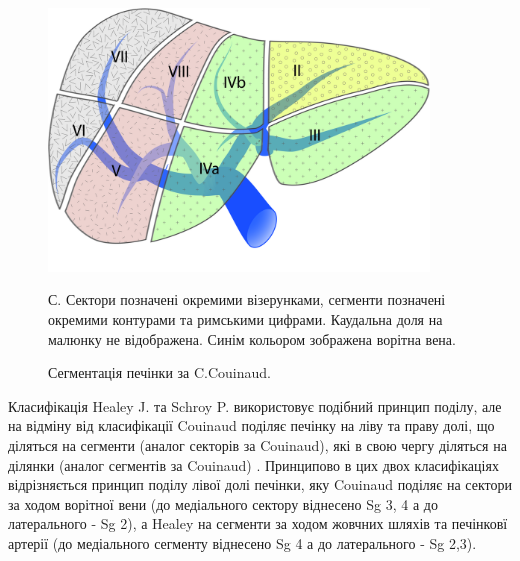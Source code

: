\begin{figure}[h]
\caption{Сегментація печінки за C.Couinaud.}

\includegraphics[width=0.9\textwidth]{Illustrations/Chapter_01/Couinaud.jpg}
\label{fig:Couinaud}

\medskip
\small
С. Сектори позначені окремими візерунками, сегменти позначені окремими контурами та римськими цифрами. Каудальна доля на малюнку не відображена. Синім кольором зображена ворітна вена.

\end{figure}

Класифікація Healey J. та Schroy P. використовує подібний принцип поділу, але на відміну від класифікації Couinaud поділяє печінку на ліву та праву долі, що діляться на сегменти (аналог секторів за Couinaud), які в свою чергу діляться на ділянки (аналог сегментів за Couinaud) \cite{HEALEY1953}. Принципово в цих двох класифікаціях відрізняється принцип поділу лівої долі печінки, яку Couinaud поділяє на сектори за ходом ворітної вени (до медіального сектору віднесено Sg 3, 4 а до латерального -  Sg 2), а Healey на сегменти за ходом жовчних шляхів та печінковї артерії (до медіального сегменту віднесено Sg 4 а до латерального - Sg 2,3).  

